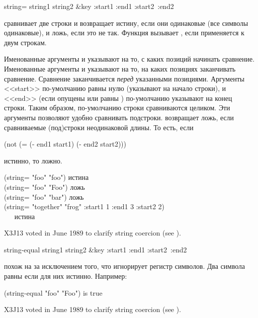 \begin{defun}[Функция]
string= string1 string2 &key :start1 :end1 :start2~:end2

 сравнивает две строки и возвращает истину, если они одинаковые
(все символы одинаковые), и ложь, если это не так.
Функция  вызывает , если применяется к двум строкам.

Именованные аргументы  и  указывают на то, с каких
позиций начинать сравнение.
Именованные аргументы  и  указывают на то, на каких
позициях заканчивать сравнение.
Сравнение заканчивается \emph{перед} указанными позициями.
Аргументы <<start>> по-умолчанию равны нулю (указывают на начало строки), и 
<<end>> (если опущены или равны {\false}) по-умолчанию указывают на конец
строки. Таким образом, по-умолчанию строки сравниваются целиком.
Эти аргументы позволяют удобно сравнивать подстроки.
 возвращает ложь, если сравниваемые (под)строки неодинаковой
длины. То есть, если 
\begin{lisp}
(not (= (- end1 start1) (- end2 start2)))
\end{lisp}
истинно, то  ложно.

\begin{lisp}
(string= "foo" "foo") \textrm{истина} \\
(string= "foo" "Foo") \textrm{ложь} \\
(string= "foo" "bar") \textrm{ложь} \\
(string= "together" "frog" :start1 1 :end1 3 :start2 2) \\
~~~\textrm{истина}
\end{lisp}

\begin{newer}
X3J13 voted in June 1989 
to clarify string coercion (see ).
\end{newer}
\end{defun}

\begin{defun}[Функция]
string-equal string1 string2 &key :start1 :end1 :start2~:end2

 похож на  за исключением того, что игнорирует
регистр символов. Два символа равны если  для них истинно.
Например:
\begin{lisp}
(string-equal "foo" "Foo") \textrm{is true}
\end{lisp}

\begin{newer}
X3J13 voted in June 1989 
to clarify string coercion (see ).
\end{newer}
\end{defun}

